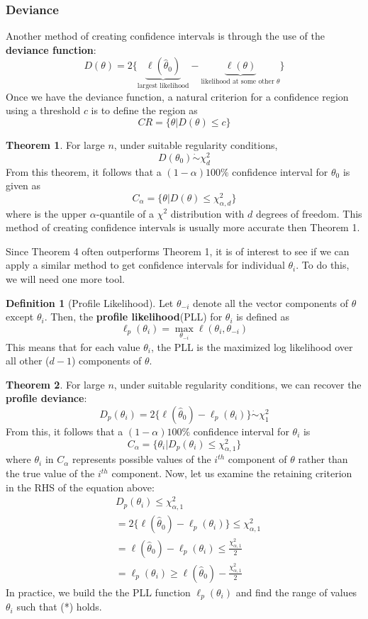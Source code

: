 \documentclass{article}
\theoremstyle{definition}
\newtheorem{theorem}{Theorem}
\theoremstyle{definition}
\newtheorem{definition}{Definition}
\def\l{\ell}
\newcommand{\dotrel}[1]{\mathrel{\dot{#1}}}
\begin{document}
\subsubsection{Deviance}
Another method of creating confidence intervals is through the use of the \textbf{deviance function}:
\[D(\theta)= 2\{ \underbrace{\l(\hat{\theta}_0)}_{\text{largest likelihood}} - \underbrace{\l(\theta)}_{\text{likelihood at some other $\theta$}}\}\]
Once we have the deviance function, a natural criterion for a confidence region using a threshold $c$ is to define the region as
\[CR=\{\theta| D(\theta)\leq c\}\]

\begin{theorem}For large $n$, under suitable regularity conditions, 
\[D(\theta_0)\dotrel{\sim} \chi^2_d\]
From this theorem, it follows that a $(1-\alpha)100\%$ confidence interval for $\theta_0$ is given as 
\[C_\alpha= \{\theta| D(\theta)\leq \chi_{\alpha,d}^2\}\]
where is the upper $\alpha$-quantile of a $\chi^2$ distribution with $d$ degrees of freedom. This method of creating confidence intervals is usually more accurate then Theorem 1.
\end{theorem}
Since Theorem 4 often outperforms Theorem 1, it is of interest to see if we can apply a similar method to get confidence intervals for individual $\theta_i$. To do this, we will need one more tool.
\begin{definition}[Profile Likelihood]
Let $\theta_{-i}$ denote all the vector components of $\theta$ except $\theta_i$. Then, the \textbf{profile likelihood}(PLL) for $\theta_i$ is defined as 
\[\l_p(\theta_i)= \max_{\theta_{-i}}\l(\theta_i, \theta_{-i})\]
This means that for each value $\theta_i$, the PLL is the maximized log likelihood over all other ($d-1$) components of $\theta$.
\end{definition}

\begin{theorem}For large $n$, under suitable regularity conditions, we can recover the \textbf{profile deviance}:
\[D_p(\theta_i)= 2 \{ \l(\hat{\theta}_0) - \l_p(\theta_i)\}\dotrel{\sim} \chi^2_1\]
From this, it follows that a $(1-\alpha)100\%$ confidence interval for $\theta_i$ is
\[C_\alpha = \{\theta_i | D_p(\theta_i)\leq \chi^2_{\alpha,1}\}\]
where $\theta_i$ in $C_\alpha$ represents possible values of the $i^{th}$ component of $\theta$ rather than the true value of the $i^{th}$ component.
Now, let us examine the retaining criterion in the RHS of the equation above:
\begin{align*}
    &D_p(\theta_i)\leq \chi_{\alpha,1}^2\\
    &=2 \{ \l(\hat{\theta}_0) - \l_p(\theta_i)\} \leq \chi_{\alpha,1}^2\\
    &= \l(\hat{\theta}_0) - \l_p(\theta_i) \leq \frac{\chi_{\alpha,1}^2}{2}\\
    &= \l_p(\theta_i) \geq \l(\hat{\theta}_0) -\frac{\chi_{\alpha,1}^2}{2} \tag{*}
\end{align*}
In practice, we build the the PLL function $\l_p(\theta_i)$ and find the range of values $\theta_i$ such that (*) holds.
\end{theorem}
\end{document}
